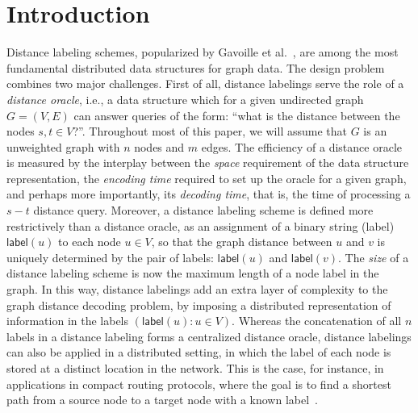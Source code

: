\documentclass{article}[11pt,letter]
\newcommand{\encoding}{\mathsf{label}}
\begin{document}
\thispagestyle{empty}


\newpage

\section{Introduction}
Distance labeling schemes, popularized by Gavoille et al.~\cite{Gavoille:2004:DLG:1036161.1036165}, are among the most fundamental distributed data structures for graph data. The design problem combines two major challenges. First of all, distance labelings serve the role of a \emph{distance oracle}, i.e., a data structure which for a given undirected graph $G=(V,E)$ can answer queries of the form: ``what is the distance between the nodes $s, t \in V$?''. Throughout most of this paper, we will assume that $G$ is an unweighted graph with $n$ nodes and $m$ edges. The efficiency of a distance oracle is measured by the interplay between the \emph{space} requirement of the data structure representation, the \emph{encoding time} required to set up the oracle for a given graph, and perhaps more importantly, its \emph{decoding time}, that is, the time of processing a $s-t$ distance query. Moreover, a distance labeling scheme is defined more restrictively than a distance oracle, as an assignment of a binary string (label) $\encoding(u)$ to each node $u\in V$, so that the graph distance between $u$ and $v$ is uniquely determined by the pair of labels: $\encoding(u)$ and $\encoding(v)$. The \emph{size} of a distance labeling scheme is now the maximum length of a node label in the graph. In this way, distance labelings add an extra layer of complexity to the graph distance decoding problem, by imposing a distributed representation of information in the labels $(\encoding(u) : u\in V)$. Whereas the concatenation of all $n$ labels in a distance labeling forms a centralized distance oracle, distance labelings can also be applied in a distributed setting, in which the label of each node is stored at a distinct location in the network. This is the case, for instance, in applications in compact routing protocols, where the goal is to find a shortest path from a source node to a target node with a known label~\cite{ChepoiDEHVX12}.
\end{document}
